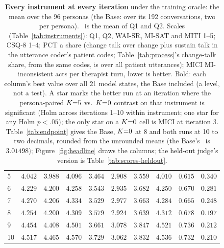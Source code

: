 \begin{table}[t]
\begin{tabular}{@{}lrrrrrrrrr@{}}
5 & $4.042$ & $3.988$ & $4.096$ & $3.464$\rlap{$^{*}$} & $2.908$\rlap{$^{*}$} & $3.559$\rlap{$^{*}$} & $4.010$ & $0.615$ & $0.340$\\
6 & $4.229$\rlap{$^{*}$} & $4.200$\rlap{$^{*}$} & $4.258$ & $3.543$\rlap{$^{*}$} & $2.935$\rlap{$^{*}$} & $3.682$\rlap{$^{*}$} & $4.250$\rlap{$^{*}$} & $0.670$\rlap{$^{*}$} & $0.281$\\
7 & $4.270$\rlap{$^{*}$} & $4.206$\rlap{$^{*}$} & $4.334$ & $3.529$\rlap{$^{*}$} & $2.977$\rlap{$^{*}$} & $3.663$\rlap{$^{*}$} & $4.284$\rlap{$^{*}$} & $0.665$\rlap{$^{*}$} & $0.248$\\
8 & $4.254$\rlap{$^{*}$} & $4.200$\rlap{$^{*}$} & $4.309$ & $3.579$\rlap{$^{*}$} & $2.924$\rlap{$^{*}$} & $3.639$\rlap{$^{*}$} & $4.312$ & $0.678$\rlap{$^{*}$} & $0.197$\rlap{$^{*}$}\\
9 & $4.454$\rlap{$^{*}$} & $4.408$\rlap{$^{*}$} & $4.501$\rlap{$^{*}$} & $3.661$\rlap{$^{*}$} & $\mathbf{3.078}$\rlap{$^{*}$} & $\mathbf{3.847}$\rlap{$^{*}$} & $4.521$\rlap{$^{*}$} & $\mathbf{0.736}$\rlap{$^{*}$} & $0.212$\rlap{$^{*}$}\\
10 & $\mathbf{4.517}$\rlap{$^{*}$} & $\mathbf{4.465}$\rlap{$^{*}$} & $\mathbf{4.570}$\rlap{$^{*}$} & $\mathbf{3.729}$\rlap{$^{*}$} & $3.062$\rlap{$^{*}$} & $3.832$\rlap{$^{*}$} & $\mathbf{4.536}$\rlap{$^{*}$} & $0.732$\rlap{$^{*}$} & $0.210$\rlap{$^{*}$}\\
\bottomrule
\end{tabular}
\caption{\textbf{Every instrument at every iteration} under the training oracle: the mean over the
96 personas (the Base: over its 192 conversations, two per persona). \QQ\ is the mean of Q1 and
Q2. Scales (Table~\ref{tab:instruments}): Q1, Q2, WAI-SR, MI-SAT and MITI 1--5; CSQ-8 1--4; PCT a
share (change talk over change plus sustain talk in the utterance coder's patient codes;
Table~\ref{tab:process}'s change-talk share, from the same codes, is over all patient utterances); MICI
MI-inconsistent acts per therapist turn, lower is better. Bold: each column's best value over all
21 model states, the Base included (a level, not a test). A star marks the better run at an
iteration where the persona-paired $K{=}5$ vs.\ $K{=}0$ contrast on that instrument is significant
(Holm across iterations 1--10 within instrument; one star for any Holm $p<.05$); the only star on a
$K{=}0$ cell is MICI at iteration 3. Table~\ref{tab:endpoint} gives the Base, $K{=}0$ at 8 and both
runs at 10 to two decimals, rounded from the unrounded means (the Base's \QQ\ is $3.01498$);
Figure~\ref{fig:headline} draws the columns; the held-out judge's version is
Table~\ref{tab:scores-heldout}.}
\label{tab:scores}
\end{table}

